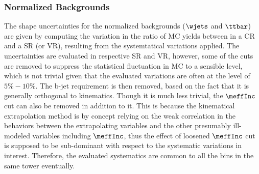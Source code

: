 \subsubsection{Normalized Backgrounds} 
%
The shape uncertainties for the normalized backgrounds ($\wjets$ and $\ttbar$) are given by computing the variation in the ratio of MC yields between in a CR and a SR (or VR), resulting from the systemtatical variations applied.
The uncertainties are evaluated in respective SR and VR, however, some of the cuts are removed to suppress the statistical fluctuation in MC to a sensible level, which is not trivial given that the evaluated variations are often at the level of $5\%-10\%$.
The b-jet requirement is then removed, based on the fact that it is generally orthogonal to kinematics.
Though it is much less trivial, the $\meffInc$ cut can also be removed in addition to it. 
This is because the kinematical extrapolation method is by concept relying on the weak correlation in the behaviors between the extrapolating variables and the other presumably ill-modeled variables including $\meffInc$, thus the effect of loosened $\meffInc$ cut is supposed to be sub-dominant with respect to the systematic variations in interest.
%
Therefore, the evaluated systematics are common to all the bins in the same tower eventually. \\

